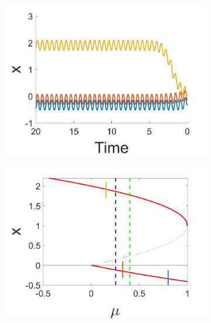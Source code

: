 \begin{figure}[H]
\centering
\begin{subfigure}{.5\textwidth}
 \centering
 \includegraphics[width=\linewidth]{oneD/osc_timeseries.jpg}
 \caption{}
\end{subfigure}%
\begin{subfigure}{.5\textwidth}
 \centering
 \includegraphics[width=\linewidth]{oneD/osc_bif_diagram.jpg}
 \caption{}
\end{subfigure}
\begin{subfigure}{.5\textwidth}
 \centering

\end{subfigure}
\end{figure}
